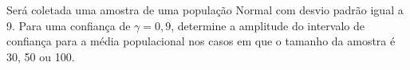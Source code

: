 %
%


\begin{exercicioBanco}[\valorquestao]
    Será coletada uma amostra de uma população Normal com desvio padrão igual a 9. Para uma confiança de \(\gamma = 0,9\), determine a amplitude do intervalo de confiança para a média populacional nos casos em que o tamanho da amostra é 30, 50 ou 100.
\end{exercicioBanco}


